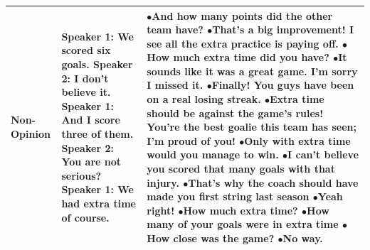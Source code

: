 \documentclass[11pt]{article}
\begin{document}
\begin{longtable}{|p{2cm}|p{3cm}|p{10cm}|}
 Non-Opinion & \textbf{Speaker 1:} We scored six goals. \newline \hspace*{0.5cm} \textbf{Speaker 2:} I don't believe it. \newline \textbf{Speaker 1:} And I score three of them. \newline \hspace*{0.5cm} \textbf{Speaker 2:} You are not serious? \newline \textbf{Speaker 1:} We had extra time of course. & $\bullet$And how many points did the other team have? \newline $\bullet$That's a big improvement! I see all the extra practice is paying off. \newline $\bullet$How much extra time did you have? \newline $\bullet$It sounds like it was a great game. I'm sorry I missed it. \newline $\bullet$Finally! You guys have been on a real losing streak. \newline \newline $\bullet$Extra time should be against the game's rules!	You're the best goalie this team has seen; I'm proud of you! \newline $\bullet$Only with extra time would you manage to win. \newline $\bullet$I can't believe you scored that many goals with that injury. \newline $\bullet$That's why the coach should have made you first string last season	\newline \newline $\bullet$Yeah right! \newline $\bullet$How much extra time? \newline $\bullet$How many of your goals were in extra time \newline $\bullet$How close was the game? \newline $\bullet$No way. \\\hline

\end{longtable}
\end{document}
